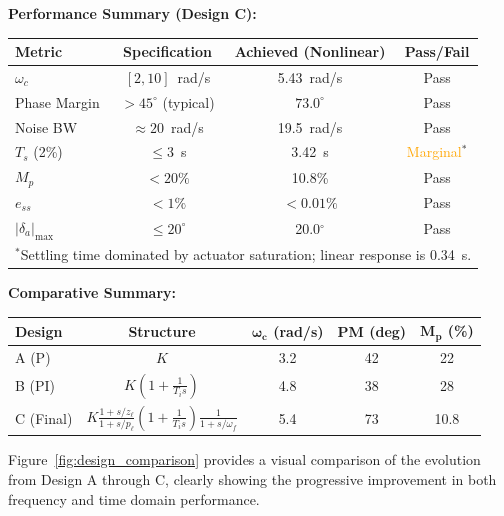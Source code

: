 \textbf{Performance Summary (Design C):}
\begin{center}
\begin{tabular}{lccc}
\hline
\textbf{Metric} & \textbf{Specification} & \textbf{Achieved (Nonlinear)} & \textbf{Pass/Fail} \\
\hline
$\omega_c$ & $[2,10]$~rad/s & 5.43~rad/s & \textcolor{green!60!black}{Pass} \\
Phase Margin & $>45^\circ$ (typical) & $73.0^\circ$ & \textcolor{green!60!black}{Pass} \\
Noise BW & $\approx 20$~rad/s & 19.5~rad/s & \textcolor{green!60!black}{Pass} \\
$T_s$ (2\%) & $\le 3$~s & 3.42~s & \textcolor{orange}{Marginal}$^*$ \\
$M_p$ & $<20\%$ & 10.8\% & \textcolor{green!60!black}{Pass} \\
$e_{ss}$ & $<1\%$ & $<0.01\%$ & \textcolor{green!60!black}{Pass} \\
$|\delta_a|_{\max}$ & $\le 20^\circ$ & 20.0$^\circ$ & \textcolor{green!60!black}{Pass} \\
\hline
\multicolumn{4}{l}{$^*$Settling time dominated by actuator saturation; linear response is 0.34~s.}
\end{tabular}
\end{center}

\textbf{Comparative Summary:}
\begin{center}
\begin{tabular}{lcccc}
\hline
\textbf{Design} & \textbf{Structure} & $\boldsymbol{\omega_c}$ \textbf{(rad/s)} & \textbf{PM (deg)} & $\boldsymbol{M_p}$ \textbf{(\%)} \\
\hline
A (P) & $K$ & 3.2 & 42 & 22 \\
B (PI) & $K(1+\tfrac{1}{T_i s})$ & 4.8 & 38 & 28 \\
C (Final) & $K\tfrac{1+s/z_\ell}{1+s/p_\ell}(1+\tfrac{1}{T_i s})\tfrac{1}{1+s/\omega_f}$ & 5.4 & 73 & 10.8 \\
\hline
\end{tabular}
\end{center}

Figure~\ref{fig:design_comparison} provides a visual comparison of the evolution from Design A through C, clearly showing the progressive improvement in both frequency and time domain performance.


